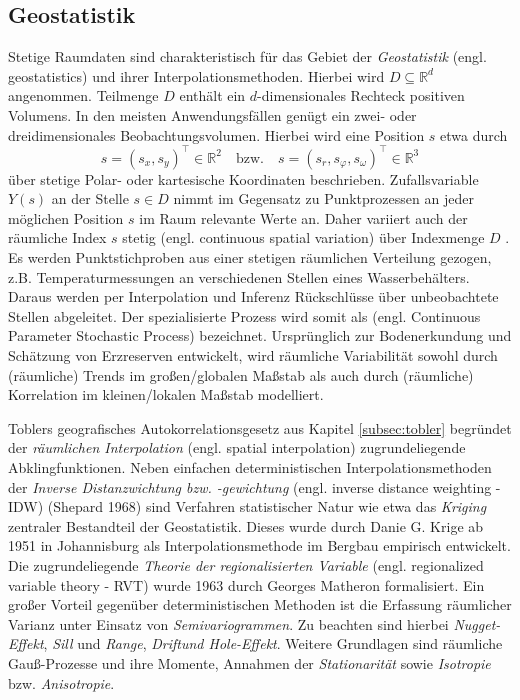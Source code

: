 \subsection*{Geostatistik}
\label{subsec:geostatistics}
Stetige Raumdaten sind charakteristisch für das Gebiet der \emph{Geostatistik} 
(engl. geostatistics) und ihrer Interpolationsmethoden. Hierbei wird 
$D \subseteq \mathds{R}^d$ angenommen. Teilmenge $D$ enthält ein $d$-dimensionales 
Rechteck positiven Volumens. In den meisten Anwendungsfällen genügt ein zwei- oder 
dreidimensionales Beobachtungsvolumen. Hierbei wird eine Position $s$ etwa durch
\begin{equation*}
    s=\left(s_x,s_y \right)^{\top} \in \mathds{R}^2 \quad \text{bzw.} 
    \quad s=\left(s_r,s_{\varphi },s_{\omega} \right)^{\top} \in \mathds{R}^3
\end{equation*}
über stetige Polar- oder kartesische Koordinaten beschrieben. 
Zufallsvariable $Y(s)$ an der Stelle $s \in D$ nimmt im Gegensatz zu Punktprozessen an 
jeder möglichen Position $s$ im Raum relevante Werte an. 
Daher variiert auch der räumliche Index $s$ stetig (engl. continuous spatial variation) 
über Indexmenge $D$ \citep[S.17]{gelfand_handbook_2010}. 
Es werden Punktstichproben aus einer stetigen räumlichen Verteilung gezogen, 
z.B. Temperaturmessungen an verschiedenen Stellen eines Wasserbehälters. 
Daraus werden per Interpolation und Inferenz Rückschlüsse über unbeobachtete Stellen abgeleitet. 
Der spezialisierte Prozess wird somit als 
(engl. Continuous Parameter Stochastic Process) bezeichnet. 
Ursprünglich zur Bodenerkundung und Schätzung von Erzreserven entwickelt, 
wird räumliche Variabilität sowohl durch (räumliche) Trends 
im großen/globalen Maßstab als auch durch (räumliche) Korrelation 
im kleinen/lokalen Maßstab modelliert.

Toblers geografisches Autokorrelationsgesetz aus Kapitel \ref{subsec:tobler} 
begründet der \emph{räumlichen Interpolation} (engl. spatial interpolation) zugrundeliegende Abklingfunktionen. 
Neben einfachen deterministischen Interpolationsmethoden 
der \emph{Inverse Distanzwichtung bzw. -gewichtung} (engl. inverse distance weighting - IDW)  (Shepard 1968)
sind Verfahren statistischer Natur wie etwa 
das \emph{Kriging} zentraler Bestandteil der Geostatistik. 
Dieses wurde durch Danie G. Krige ab 1951 
in Johannisburg als Interpolationsmethode im Bergbau empirisch entwickelt.
Die zugrundeliegende \emph{Theorie der regionalisierten Variable} 
(engl. regionalized variable theory - RVT) wurde 1963 durch Georges Matheron formalisiert. 
Ein großer Vorteil gegenüber deterministischen Methoden ist die Erfassung räumlicher Varianz unter 
Einsatz von \emph{Semivariogrammen}. 
Zu beachten sind hierbei \emph{Nugget-Effekt}, \emph{Sill} und \emph{Range}, 
\emph{Driftund Hole-Effekt}.
Weitere Grundlagen sind räumliche Gauß-Prozesse und ihre Momente, 
Annahmen der \emph{Stationarität} sowie \emph{Isotropie} bzw. \emph{Anisotropie}.

